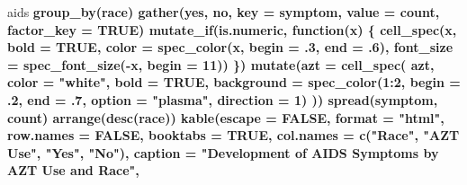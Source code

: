 \documentclass[]{book}
\newenvironment{Shaded}{\begin{snugshade}}{\end{snugshade}}
\newcommand{\CommentTok}[1]{\textcolor[rgb]{0.56,0.35,0.01}{\textit{#1}}}
\newcommand{\ControlFlowTok}[1]{\textcolor[rgb]{0.13,0.29,0.53}{\textbf{#1}}}
\newcommand{\DataTypeTok}[1]{\textcolor[rgb]{0.13,0.29,0.53}{#1}}
\newcommand{\DecValTok}[1]{\textcolor[rgb]{0.00,0.00,0.81}{#1}}
\newcommand{\FloatTok}[1]{\textcolor[rgb]{0.00,0.00,0.81}{#1}}
\newcommand{\KeywordTok}[1]{\textcolor[rgb]{0.13,0.29,0.53}{\textbf{#1}}}
\newcommand{\NormalTok}[1]{#1}
\newcommand{\OperatorTok}[1]{\textcolor[rgb]{0.81,0.36,0.00}{\textbf{#1}}}
\newcommand{\OtherTok}[1]{\textcolor[rgb]{0.56,0.35,0.01}{#1}}
\newcommand{\StringTok}[1]{\textcolor[rgb]{0.31,0.60,0.02}{#1}}
\begin{document}
\begin{Shaded}
\begin{Highlighting}[]
\NormalTok{aids }\OperatorTok{%
\StringTok{  }\KeywordTok{group_by}\NormalTok{(race) }\OperatorTok{%
\StringTok{  }\KeywordTok{gather}\NormalTok{(yes, no, }\DataTypeTok{key =}\NormalTok{ symptom, }\DataTypeTok{value =}\NormalTok{ count, }\DataTypeTok{factor_key =} \OtherTok{TRUE}\NormalTok{) }\OperatorTok{%
\StringTok{  }\KeywordTok{mutate_if}\NormalTok{(is.numeric, }\ControlFlowTok{function}\NormalTok{(x) \{}
    \KeywordTok{cell_spec}\NormalTok{(x, }\DataTypeTok{bold =} \OtherTok{TRUE}\NormalTok{,}
              \DataTypeTok{color =} \KeywordTok{spec_color}\NormalTok{(x, }\DataTypeTok{begin =} \FloatTok{.3}\NormalTok{, }\DataTypeTok{end =} \FloatTok{.6}\NormalTok{),}
              \DataTypeTok{font_size =} \KeywordTok{spec_font_size}\NormalTok{(}\OperatorTok{-}\NormalTok{x, }\DataTypeTok{begin =} \DecValTok{11}\NormalTok{))}
\NormalTok{  \}) }\OperatorTok{%
\StringTok{  }\KeywordTok{mutate}\NormalTok{(}\DataTypeTok{azt =} \KeywordTok{cell_spec}\NormalTok{(}
\NormalTok{    azt, }\DataTypeTok{color =} \StringTok{"white"}\NormalTok{, }\DataTypeTok{bold =} \OtherTok{TRUE}\NormalTok{,}
    \DataTypeTok{background =} \KeywordTok{spec_color}\NormalTok{(}\DecValTok{1}\OperatorTok{:}\DecValTok{2}\NormalTok{, }\DataTypeTok{begin =} \FloatTok{.2}\NormalTok{, }\DataTypeTok{end =} \FloatTok{.7}\NormalTok{, }\DataTypeTok{option =} \StringTok{"plasma"}\NormalTok{, }\DataTypeTok{direction =} \DecValTok{1}\NormalTok{)}
\NormalTok{  )) }\OperatorTok{%
\StringTok{  }\KeywordTok{spread}\NormalTok{(symptom, count) }\OperatorTok{%
\StringTok{  }\KeywordTok{arrange}\NormalTok{(}\KeywordTok{desc}\NormalTok{(race)) }\OperatorTok{%
\StringTok{  }\KeywordTok{kable}\NormalTok{(}\DataTypeTok{escape =} \OtherTok{FALSE}\NormalTok{, }\DataTypeTok{format =} \StringTok{"html"}\NormalTok{, }\DataTypeTok{row.names =} \OtherTok{FALSE}\NormalTok{, }\DataTypeTok{booktabs =} \OtherTok{TRUE}\NormalTok{,}
        \DataTypeTok{col.names =} \KeywordTok{c}\NormalTok{(}\StringTok{"Race"}\NormalTok{, }\StringTok{"AZT Use"}\NormalTok{, }\StringTok{"Yes"}\NormalTok{, }\StringTok{"No"}\NormalTok{),}
        \DataTypeTok{caption =} \StringTok{"Development of AIDS Symptoms by AZT Use and Race"}\NormalTok{,}
}}}}}}}
\end{Highlighting}
\end{Shaded}
\end{document}
